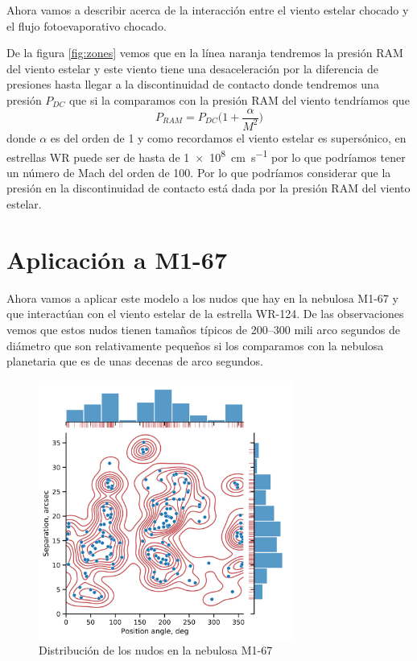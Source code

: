 \documentclass{book}
\begin{document}
Ahora vamos a describir acerca de la interacción entre el viento estelar chocado y el flujo fotoevaporativo chocado. 

De la figura \ref{fig:zones} vemos que en la línea naranja tendremos la presión RAM del viento estelar y este viento tiene una desaceleración por la diferencia de presiones hasta llegar a la discontinuidad de contacto donde tendremos una presión $P_{DC}$ que si la comparamos con la presión RAM del viento tendríamos que
\[P_{RAM}=P_{DC}\Big(1+\frac{\alpha}{M^2}\Big)\] donde $\alpha$ es del orden de 1 y como recordamos el viento estelar es supersónico, en estrellas WR puede ser de hasta de \SI{1e8}{cm.s^{-1}} por lo que podríamos tener un número de Mach del orden de 100. Por lo que podríamos considerar que la presión en la discontinuidad de contacto está dada por la presión RAM del viento estelar.


\chapter{Aplicación a M1-67}

Ahora vamos a aplicar este modelo a los nudos que hay en la nebulosa M1-67 y que interactúan con el viento estelar de la estrella WR-124. De las observaciones vemos que estos nudos tienen tamaños típicos de 200--300 mili arco segundos de diámetro que son relativamente pequeños si los comparamos con la nebulosa planetaria que es de unas decenas de arco segundos. 

\begin{figure}[h!]
    \centering    \includegraphics[width=0.75\textwidth]{images Chapter 2/C2_nudos_distribucion.png}
    \caption{Distribución de los nudos en la nebulosa M1-67}
    \label{fig:dis_nudos}
\end{figure}
\end{document}

